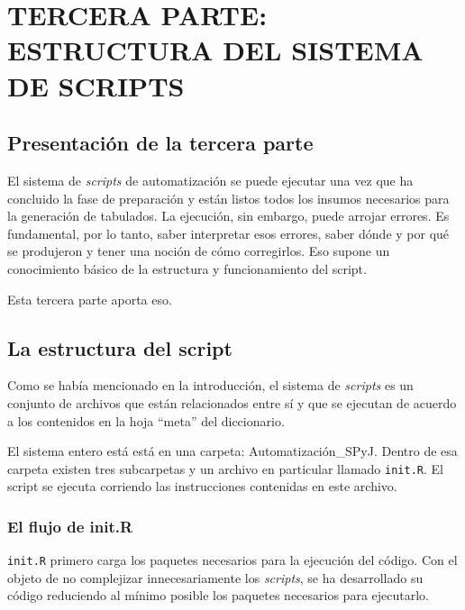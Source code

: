 \documentclass[
  spanish,
]{book}
\begin{document}
\hypertarget{part-tercera-parte-estructura-del-sistema-de-scripts}{%
\part*{TERCERA PARTE: ESTRUCTURA DEL SISTEMA DE SCRIPTS}\label{part-tercera-parte-estructura-del-sistema-de-scripts}}

\hypertarget{presentaciuxf3n-de-la-tercera-parte}{%
\chapter*{Presentación de la tercera parte}\label{presentaciuxf3n-de-la-tercera-parte}}

El sistema de \emph{scripts} de automatización se puede ejecutar una vez que ha concluido la fase de preparación y están listos todos los insumos necesarios para la generación de tabulados. La ejecución, sin embargo, puede arrojar errores. Es fundamental, por lo tanto, saber interpretar esos errores, saber dónde y por qué se produjeron y tener una noción de cómo corregirlos. Eso supone un conocimiento básico de la estructura y funcionamiento del script.

Esta tercera parte aporta eso.

\hypertarget{estructura}{%
\chapter{La estructura del script}\label{estructura}}

Como se había mencionado en la introducción, el sistema de \emph{scripts} es un conjunto de archivos que están relacionados entre sí y que se ejecutan de acuerdo a los contenidos en la hoja ``meta'' del diccionario.

El sistema entero está está en una carpeta: Automatización\_SPyJ. Dentro de esa carpeta existen tres subcarpetas y un archivo en particular llamado \texttt{init.R}. El script se ejecuta corriendo las instrucciones contenidas en este archivo.

\hypertarget{el-flujo-de-init.r}{%
\section{El flujo de init.R}\label{el-flujo-de-init.r}}

\texttt{init.R} primero carga los paquetes necesarios para la ejecución del código. Con el objeto de no complejizar innecesariamente los \emph{scripts}, se ha desarrollado su código reduciendo al mínimo posible los paquetes necesarios para ejecutarlo.
\end{document}
